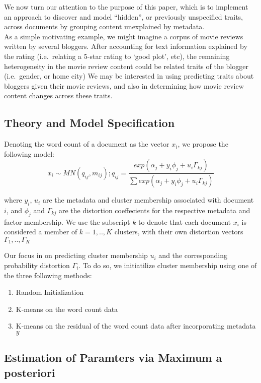 \documentclass[]{article}
\begin{document}
We now turn our attention to the purpose of this paper, which is to
implement an approach to discover and model ``hidden'', or previously
unspecified traits, across documents by grouping content unexplained by
metadata.\\As a simple motivating example, we might imagine a corpus of
movie reviews written by several bloggers. After accounting for text
information explained by the rating (i.e.~relating a 5-star rating to
`good plot', etc), the remaining heterogeneity in the movie review
content could be related traits of the blogger (i.e.~gender, or home
city) We may be interested in using predicting traits about bloggers
given their movie reviews, and also in determining how movie review
content changes across these traits.

\subsection{Theory and Model
Specification}\label{theory-and-model-specification}

Denoting the word count of a document as the vector $x_i$, we propose
the following model:
\[ x_{i} \sim MN(q_{ij},m_{ij}) ; q_{ij} = \frac{exp(\alpha_j + y_i \phi_j + u_i \Gamma_{kj})}{\sum{exp(\alpha_j + y_i \phi_j + u_i \Gamma_{kj})}}\]

where $y_i$, $u_i$ are the metadata and cluster membership associated
with document $i$, and $\phi_j$ and $\Gamma_{kj}$ are the distortion
coeffecients for the respective metadata and factor membership. We use
the subscript $k$ to denote that each document $x_i$ is considered a
member of $k = 1,..,K$ clusters, with their own distortion vectors
$\Gamma_1,..,\Gamma_K$

Our focus in on predicting cluster membership $u_i$ and the
corresponding probability distortion $\Gamma_i$. To do so, we
initiatilize cluster membership using one of the three following
methods:

\begin{enumerate}
\def\labelenumi{\arabic{enumi}.}
\itemsep1pt\parskip0pt
\item
  Random Initialization
\item
  K-means on the word count data
\item
  K-means on the residual of the word count data after incorporating
  metadata $y$
\end{enumerate}

\subsection{Estimation of Paramters via Maximum a
posteriori}\label{estimation-of-paramters-via-maximum-a-posteriori}
\end{document}
